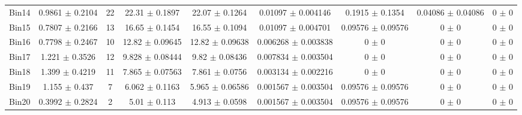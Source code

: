 \begin{tabular}{@{\extracolsep{4pt}}lcccccccc@{}}
     Bin14 & 0.9861 $\pm$ 0.2104 & 22 & 22.31 $\pm$ 0.1897 & 22.07 $\pm$ 0.1264 & 0.01097 $\pm$ 0.004146 & 0.1915 $\pm$ 0.1354 & 0.04086 $\pm$ 0.04086 & 0 $\pm$ 0 \\ 
     Bin15 & 0.7807 $\pm$ 0.2166 & 13 & 16.65 $\pm$ 0.1454 & 16.55 $\pm$ 0.1094 & 0.01097 $\pm$ 0.004701 & 0.09576 $\pm$ 0.09576 & 0 $\pm$ 0 & 0 $\pm$ 0 \\ 
     Bin16 & 0.7798 $\pm$ 0.2467 & 10 & 12.82 $\pm$ 0.09645 & 12.82 $\pm$ 0.09638 & 0.006268 $\pm$ 0.003838 & 0 $\pm$ 0 & 0 $\pm$ 0 & 0 $\pm$ 0 \\ 
     Bin17 & 1.221 $\pm$ 0.3526 & 12 & 9.828 $\pm$ 0.08444 & 9.82 $\pm$ 0.08436 & 0.007834 $\pm$ 0.003504 & 0 $\pm$ 0 & 0 $\pm$ 0 & 0 $\pm$ 0 \\ 
     Bin18 & 1.399 $\pm$ 0.4219 & 11 & 7.865 $\pm$ 0.07563 & 7.861 $\pm$ 0.0756 & 0.003134 $\pm$ 0.002216 & 0 $\pm$ 0 & 0 $\pm$ 0 & 0 $\pm$ 0 \\ 
     Bin19 & 1.155 $\pm$ 0.437 & 7 & 6.062 $\pm$ 0.1163 & 5.965 $\pm$ 0.06586 & 0.001567 $\pm$ 0.003504 & 0.09576 $\pm$ 0.09576 & 0 $\pm$ 0 & 0 $\pm$ 0 \\ 
     Bin20 & 0.3992 $\pm$ 0.2824 & 2 & 5.01 $\pm$ 0.113 & 4.913 $\pm$ 0.0598 & 0.001567 $\pm$ 0.003504 & 0.09576 $\pm$ 0.09576 & 0 $\pm$ 0 & 0 $\pm$ 0 \\ 
\hline\hline
  \end{tabular}
